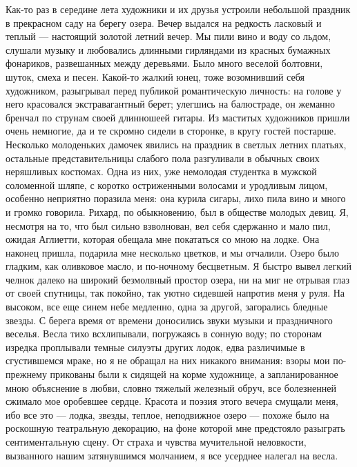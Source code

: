 Как-то раз  в середине лета  художники и их друзья  устроили небольшой
праздник в прекрасном саду на  берегу озера. Вечер выдался на редкость
ласковый и теплый  --- настоящий золотой летний вечер. Мы  пили вино и
воду  со льдом,  слушали музыку  и любовались  длинными гирляндами  из
красных бумажных  фонариков, развешанных  между деревьями.  Было много
веселой болтовни,  шуток, смеха  и песен.  Какой-то жалкий  юнец, тоже
возомнивший себя  художником, разыгрывал перед  публикой романтическую
личность: на голове у  него красовался экстравагантный берет; улегшись
на балюстраде, он жеманно бренчал  по струнам своей длинношеей гитары.
Из  маститых  художников  пришли  очень  немногие,  да  и  те  скромно
сидели  в сторонке,  в  кругу гостей  постарше. Несколько  молоденьких
дамочек  явились  на  праздник  в светлых  летних  платьях,  остальные
представительницы слабого пола разгуливали  в обычных своих неряшливых
костюмах. Одна  из них, уже  немолодая студентка в  мужской соломенной
шляпе,  с коротко  остриженными волосами  и уродливым  лицом, особенно
неприятно поразила меня:  она курила сигары, лихо пила вино  и много и
громко говорила. Рихард, по обыкновению, был в обществе молодых девиц.
Я, несмотря  на то, что  был сильно  взволнован, вел себя  сдержанно и
мало пил, ожидая  Аглиетти, которая обещала мне покататься  со мною на
лодке.  Она  наконец пришла,  подарила  мне  несколько цветков,  и  мы
отчалили.  Озеро  было  гладким,  как оливковое  масло,  и  по-ночному
бесцветным. Я быстро вывел легкий  челнок далеко на широкий безмолвный
простор  озера, ни  на  миг не  отрывая глаз  от  своей спутницы,  так
покойно, так уютно сидевшей напротив меня  у руля. На высоком, все еще
синем  небе медленно,  одна за  другой, загорались  бледные звезды.  С
берега  время  от  времени  доносились  звуки  музыки  и  праздничного
веселья. Весла тихо всхлипывали, погружаясь в сонную воду; по сторонам
изредка  проплывали темные  силуэты  других лодок,  едва различимые  в
сгустившемся мраке,  но я не  обращал на них никакого  внимания: взоры
мои  по-прежнему  прикованы  были  к сидящей  на  корме  художнице,  а
запланированное  мною  объяснение  в любви,  словно  тяжелый  железный
обруч, все болезненней сжимало мое  оробевшее сердце. Красота и поэзия
этого  вечера смущали  меня, ибо  все это  --- лодка,  звезды, теплое,
неподвижное озеро --- похоже  было на роскошную театральную декорацию,
на  фоне которой  мне предстояло  разыграть сентиментальную  сцену. От
страха и чувства мучительной неловкости, вызванного нашим затянувшимся
молчанием, я все усерднее налегал на весла.


